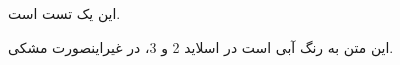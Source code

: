 \documentclass{beamer}
\begin{document}
\begin{frame}
این یک تست است. 

{ 
این متن به رنگ آبی است در اسلاید 2 و 3، در غیراینصورت مشکی.}
\end{frame}
\end{document}
